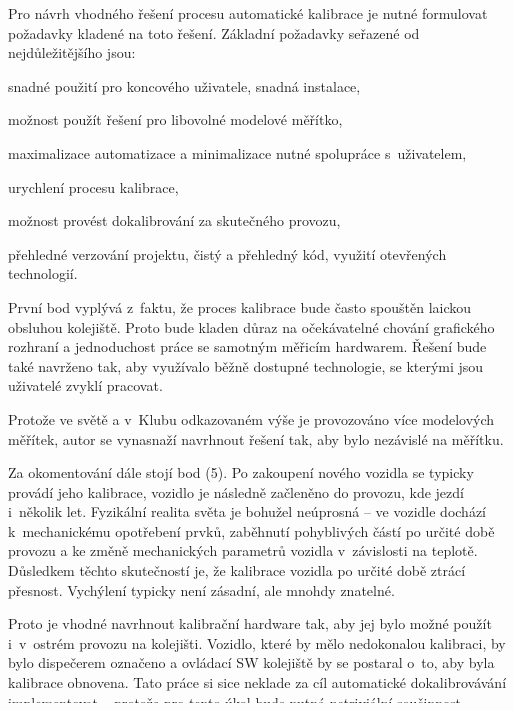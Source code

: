 Pro návrh vhodného řešení procesu automatické kalibrace je nutné formulovat
požadavky kladené na toto řešení. Základní požadavky seřazené od
nejdůležitějšího jsou:

\begin{compactenum}
	\item snadné použití pro koncového uživatele, snadná instalace,
	\item možnost použít řešení pro libovolné modelové měřítko,
	\item maximalizace automatizace a minimalizace nutné spolupráce s~uživatelem,
	\item urychlení procesu kalibrace,
	\item možnost provést dokalibrování za skutečného provozu,
	\item přehledné verzování projektu, čistý a přehledný kód, využití otevřených
	technologií.
\end{compactenum}

První bod vyplývá z~faktu, že proces kalibrace bude často spouštěn laickou obsluhou
kolejiště. Proto bude kladen důraz na očekávatelné chování grafického
rozhraní a jednoduchost práce se samotným měřicím hardwarem. Řešení bude také
navrženo tak, aby využívalo běžně dostupné technologie, se kterými jsou
uživatelé zvyklí pracovat.

Protože ve světě a v~Klubu odkazovaném výše je provozováno více modelových
měřítek, autor se vynasnaží navrhnout řešení tak, aby bylo nezávislé na
měřítku.

Za okomentování dále stojí bod (5). Po zakoupení nového vozidla se
typicky provádí jeho kalibrace, vozidlo je následně začleněno do provozu, kde
jezdí i~několik let. Fyzikální realita světa je bohužel neúprosná --
ve vozidle dochází k~mechanickému opotřebení prvků, zaběhnutí pohyblivých
částí po určité době provozu a ke změně mechanických parametrů vozidla
v~závislosti na teplotě. Důsledkem těchto skutečností je, že kalibrace vozidla
po určité době ztrácí přesnost. Vychýlení typicky není zásadní, ale mnohdy
znatelné.

Proto je vhodné navrhnout kalibrační hardware tak, aby jej bylo možné použít
i~v~ostrém provozu na kolejišti. Vozidlo, které by mělo nedokonalou kalibraci,
by bylo dispečerem označeno a ovládací SW kolejiště by se postaral o~to, aby byla
kalibrace obnovena. Tato práce si sice neklade za cíl automatické
dokalibrovávání implementovat -- protože pro tento úkol bude nutná netriviální
součinnost s~řídícím SW kolejiště -- bylo by ale nanejvýš vhodné, aby na tento
proces bylo hardwarové řešení připraveno.
